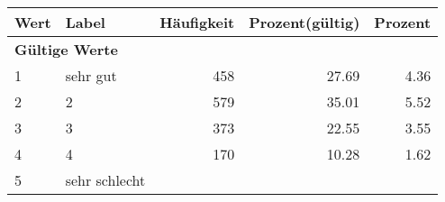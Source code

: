      \begin{longtable}{lXrrr}
     \toprule
     \textbf{Wert} & \textbf{Label} & \textbf{Häufigkeit} & \textbf{Prozent(gültig)} & \textbf{Prozent} \\
     \endhead
     \midrule
     \multicolumn{5}{l}{\textbf{Gültige Werte}}\\

     1 &
     \multicolumn{1}{X}{ sehr gut   } &


       \num{458} &
       \num[round-mode=places,round-precision=2]{27,69} &
         \num[round-mode=places,round-precision=2]{4,36} \\

     2 &
     \multicolumn{1}{X}{ 2   } &


       \num{579} &
       \num[round-mode=places,round-precision=2]{35,01} &
         \num[round-mode=places,round-precision=2]{5,52} \\

     3 &
     \multicolumn{1}{X}{ 3   } &


       \num{373} &
       \num[round-mode=places,round-precision=2]{22,55} &
         \num[round-mode=places,round-precision=2]{3,55} \\

     4 &
     \multicolumn{1}{X}{ 4   } &


       \num{170} &
       \num[round-mode=places,round-precision=2]{10,28} &
         \num[round-mode=places,round-precision=2]{1,62} \\

     5 &
     \multicolumn{1}{X}{ sehr schlecht   } &



\end{longtable}
